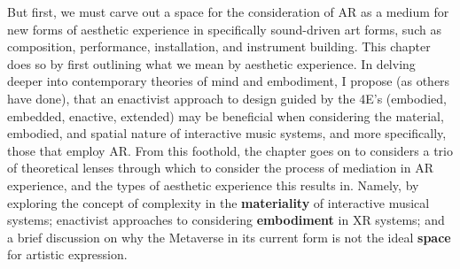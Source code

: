 But first, we must carve out a space for the consideration of AR as a medium for new forms of aesthetic experience in specifically sound-driven art forms, such as composition, performance, installation, and instrument building. This chapter does so by first outlining what we mean by aesthetic experience. In delving deeper into contemporary theories of mind and embodiment, I propose (as others have done), that an enactivist approach to design guided by the 4E's (embodied, embedded, enactive, extended) may be beneficial when considering the material, embodied, and spatial nature of interactive music systems, and more specifically, those that employ AR. From this foothold, the chapter goes on to considers a trio of theoretical lenses through which to consider the process of mediation in AR experience, and the types of aesthetic experience this results in. Namely, by exploring the concept of complexity in the \textbf{materiality} of interactive musical systems; enactivist approaches to considering \textbf{embodiment} in XR systems; and a brief discussion on why the Metaverse in its current form is not the ideal \textbf{space} for artistic expression.



